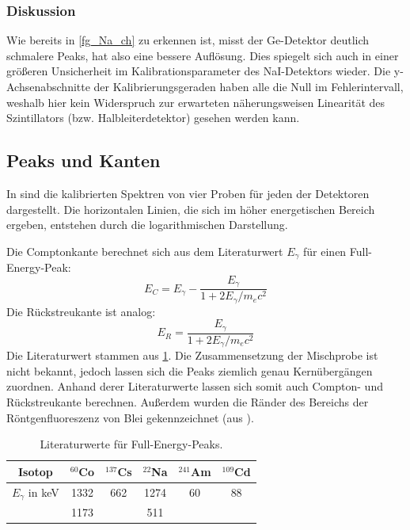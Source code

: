 \documentclass[
	a4paper,
	12pt,
	pagesize,
	ngerman
]{scrartcl}
\begin{document}
\subsubsection{Diskussion}

Wie bereits in \cref{fg_Na_ch} zu erkennen ist, misst der Ge-Detektor deutlich schmalere Peaks, hat also eine bessere Auflösung.
Dies spiegelt sich auch in einer größeren Unsicherheit im Kalibrationsparameter des NaI-Detektors wieder.
Die y-Achsenabschnitte der Kalibrierungsgeraden haben alle die Null im Fehlerintervall, weshalb hier kein Widerspruch zur erwarteten näherungsweisen Linearität des Szintillators (bzw. Halbleiterdetektor) gesehen werden kann.

\subsection{Peaks und Kanten}
In  sind die kalibrierten Spektren von vier Proben für jeden der Detektoren dargestellt.
Die horizontalen Linien, die sich im höher energetischen Bereich ergeben, entstehen durch die logarithmischen Darstellung.

Die Comptonkante berechnet sich aus dem Literaturwert $E_\gamma$ für einen Full-Energy-Peak:
\begin{equation}
	E_C = E_\gamma - \frac{E_\gamma }{1+2E_\gamma/m_ec^2}
\end{equation}
Die Rückstreukante ist analog:
\begin{equation}
	E_R =  \frac{E_\gamma}{1+2E_\gamma/m_ec^2}
\end{equation}
Die Literaturwert stammen aus \cref{tb_lit_peaks}.
	Die Zusammensetzung der Mischprobe ist nicht bekannt, jedoch lassen sich die Peaks ziemlich genau Kernübergängen zuordnen.
	Anhand derer Literaturwerte lassen sich somit auch Compton- und Rückstreukante berechnen.
Außerdem wurden die Ränder des Bereichs der Röntgenfluoreszenz von Blei gekennzeichnet (aus \cite{XRAYDB}).

\begin{table}[H]
		\centering
		\begin{tabular}{c | c | c | c | c | c}
			 Isotop& $^{60}$Co & $^{137}$Cs& $^{22}$Na & $^{241}$Am & $^{109}$Cd \\ \hline
			 $E_\gamma$ in \si{keV} & \SI{1332}{}&\SI{662}{}& \SI{1274}{} &\SI{60}{}&\SI{88}{} \\
			 & \SI{1173}{} &&\SI{511}{}& \\
		\end{tabular}
		\caption{
		Literaturwerte für Full-Energy-Peaks.\cite{Anleitung}
		}
		\label{tb_lit_peaks}
\end{table}
\end{document}
